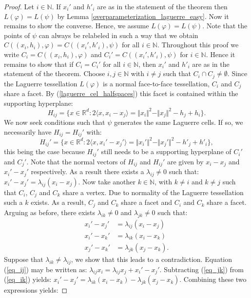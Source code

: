 \documentclass{article}
\newcommand{\NN}{\mathbb{N}}
\newcommand{\RR}{\mathbb{R}}
\theoremstyle{plain}
\theoremstyle{remark}
\theoremstyle{definition}
\begin{document}
\begin{proof}
    Let $i \in \NN$. If $x_i'$ and $h'_i$ are as in the statement of the theorem then $L(\varphi) = L(\psi)$ by Lemma \ref{overparameterization_laguerre_easy}. Now it remains to show the converse. Hence, we assume $L(\varphi) = L(\psi)$. Note that the points of $\psi$ can always be relabeled in such a way that we obtain $C((x_i,h_i),\varphi) = C((x_i',h'_i),\psi)$ for all $i \in \NN$. Throughout this proof we write $C_i = C((x_i,h_i),\varphi)$ and $C_i' = C((x_i',h'_i),\psi)$ for $i \in \NN$. Hence it remains to show that if $C_i = C_i'$ for all $i \in \NN$, then $x_i'$ and $h'_i$ are as in the statement of the theorem. Choose $i,j \in \NN$ with $i\neq j$ such that $C_i \cap C_j \neq \emptyset$. Since the Laguerre tessellation $L(\varphi)$ is a normal face-to-face tessellation, $C_i$ and $C_j$ share a facet. By (\ref{laguerre_cel_halfspaces}) this facet is contained within the supporting hyperplane:
    \[H_{ij} = \{x \in \RR^d: 2\langle x, x_i - x_j\rangle = \Vert x_i\Vert^2 - \Vert x_j\Vert^2 - h_j + h_i\}.\]
    We now seek conditions such that $\psi$ generates the same Laguerre cells. If so, we necessarily have $H_{ij} = H_{ij}'$ with:
    \[H_{ij}' = \{x \in \RR^d: 2\langle x, x_i' - x_j'\rangle = \Vert x_i'\Vert^2 - \Vert x_j'\Vert^2 - h'_j + h'_i\},\]
    this being the case because $H_{ij}'$ still needs to be a supporting hyperplane of $C_i'$ and $C_j'$. Note that the normal vectors of $H_{ij}$ and $H_{ij}'$ are given by $x_i - x_j$ and $x_i' - x_j'$ respectively. As a result there exists a $\lambda_{ij} \neq 0$ such that: $x_i' - x_j' = \lambda_{ij}(x_i - x_j)$. Now take another $k \in \NN$, with $k\neq i$ and $k \neq j$ such that $C_i$, $C_j$ and $C_k$ share a vertex. Due to normality of the Laguerre tessellation such a $k$ exists. As a result, $C_j$ and $C_k$ share a facet and $C_i$ and $C_k$ share a facet. Arguing as before, there exists $\lambda_{ik}\neq 0$ and $\lambda_{jk} \neq 0$ such that:
    \begin{align}
        x_i' - x_j' &= \lambda_{ij}(x_i - x_j) \label{eq_ij}\\
        x_i' - x_k' &= \lambda_{ik}(x_i - x_k) \label{eq_ik}\\
        x_j' - x_k' &= \lambda_{jk}(x_j - x_k). \label{eq_jk}
    \end{align}
    Suppose that $\lambda_{ik} \neq \lambda_{ij}$, we show that this leads to a contradiction. Equation (\ref{eq_ij}) may be written as: $\lambda_{ij}x_i = \lambda_{ij}x_j + x_i' - x_j'$. Subtracting (\ref{eq_jk}) from (\ref{eq_ik}) yields: $x_i' - x_j' = \lambda_{ik}(x_i - x_k) - \lambda_{jk}(x_j - x_k)$. Combining these two expressions yields:

\end{proof}
\end{document}

